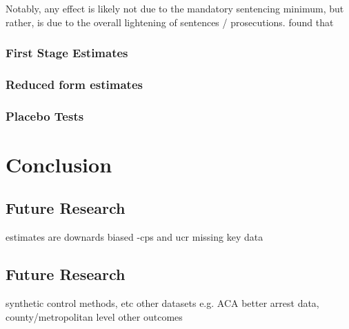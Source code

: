\documentclass{article}
\begin{document}
Notably, any effect is likely not due to the mandatory sentencing minimum, but rather, is due to the overall lightening of sentences / prosecutions. \cite{ussc} found that

\subsubsection{First Stage Estimates}

\subsubsection{Reduced form estimates}

\subsubsection{Placebo Tests}

\section{Conclusion}

\subsection{Future Research}

estimates are downards biased -cps and ucr missing key data

\subsection{Future Research}
synthetic control methods, etc
other datasets e.g. ACA
better arrest data, county/metropolitan level
other outcomes




\clearpage
\nocite{*}
\singlespacing



\clearpage





\clearpage





\clearpage
\end{document}
